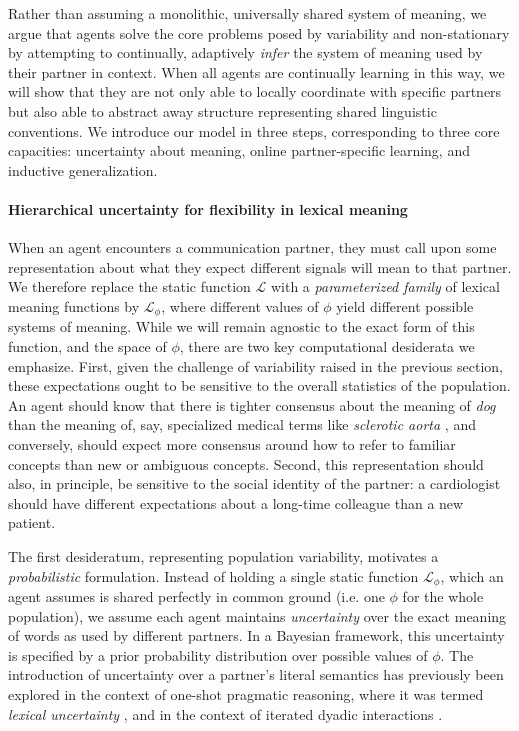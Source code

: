 Rather than assuming a monolithic, universally shared system of meaning, we argue that agents solve the core problems posed by variability and non-stationary by attempting to continually, adaptively \emph{infer} the system of meaning used by their partner in context.
When all agents are continually learning in this way, we will show that they are not only able to locally coordinate with specific partners but also able to abstract away structure representing shared linguistic conventions.
We introduce our model in three steps, corresponding to three core capacities: uncertainty about meaning, online partner-specific learning, and inductive generalization.

\paragraph{Hierarchical uncertainty for flexibility in lexical meaning} 

When an agent encounters a communication partner, they must call upon some representation about what they expect different signals will mean to that partner. 
We therefore replace the static function $\mathcal{L}$ with a \emph{parameterized family} of lexical meaning functions by $\mathcal{L}_{\phi}$, where different values of $\phi$ yield different possible systems of meaning. 
While we will remain agnostic to the exact form of this function, and the space of $\phi$, there are two key computational desiderata we emphasize.
First, given the challenge of variability raised in the previous section, these expectations ought to be sensitive to the overall statistics of the population. 
An agent should know that there is tighter consensus about the meaning of \emph{dog} than the meaning of, say, specialized medical terms like \emph{sclerotic aorta} \cite{Clark98_CommunalLexicons}, and conversely, should expect more consensus around how to refer to familiar concepts than new or ambiguous concepts.
Second, this representation should also, in principle, be sensitive to the social identity of the partner: a cardiologist should have different expectations about a long-time colleague than a new patient.

The first desideratum, representing population variability, motivates a \emph{probabilistic} formulation.
Instead of holding a single static function $\mathcal{L}_{\phi}$, which an agent assumes is shared perfectly in common ground (i.e. one $\phi$ for the whole population), we assume each agent maintains \emph{uncertainty} over the exact meaning of words as used by different partners.
In a Bayesian framework, this uncertainty is specified by a prior probability distribution over possible values of $\phi$.
The introduction of uncertainty over a partner's literal semantics has previously been explored in the context of one-shot pragmatic reasoning, where it was termed \emph{lexical uncertainty} \cite{bergen_pragmatic_2016}, and in the context of iterated dyadic interactions \cite{smith_learning_2013}. 

